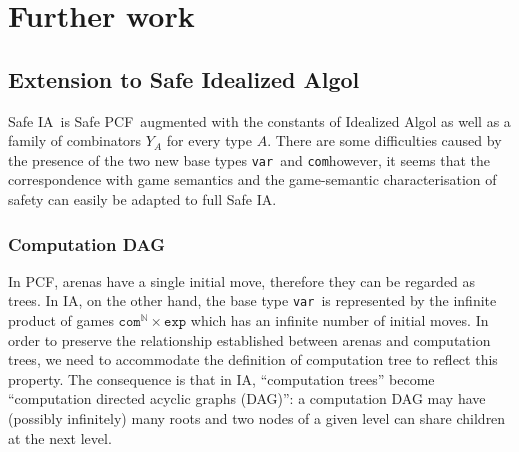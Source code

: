 \documentclass{llncs}
\newcommand\nat{\mathbb{N}}
\newcommand\ialgol{\textsf{IA}}
\newcommand\iacom{\texttt{com}}
\newcommand\iaexp{\texttt{exp}}
\newcommand\iavar{\texttt{var}}
\newcommand\pcf{\textsf{PCF}}
\begin{document}




\section{Further work}

\subsection{Extension to Safe Idealized Algol}

Safe \ialgol\  is Safe \pcf\ augmented with the constants of Idealized Algol
\cite{Reynolds81} as well as a family of combinators $Y_A$ for every
type $A$. There are some difficulties caused by the presence of the two new
base types \iavar\ and \iacom however, it seems that the correspondence with game semantics and the game-semantic characterisation
of safety can easily be adapted to full Safe \textsf{IA}.


\subsubsection{Computation DAG}
In \pcf, arenas have a single initial move, therefore they can be
regarded as trees. In \ialgol, on the other hand, the base type
\iavar\ is represented by the infinite product of games
$\iacom^{\nat} \times \iaexp$ which has an infinite number of
initial moves. In order to preserve the relationship established
between arenas and computation trees, we need to accommodate the
definition of computation tree to reflect this property. The
consequence is that in \ialgol, ``computation trees'' become
``computation directed acyclic graphs (DAG)'': a computation DAG may
have (possibly infinitely) many roots and two nodes of a given level
can share children at the next level.
\end{document}
